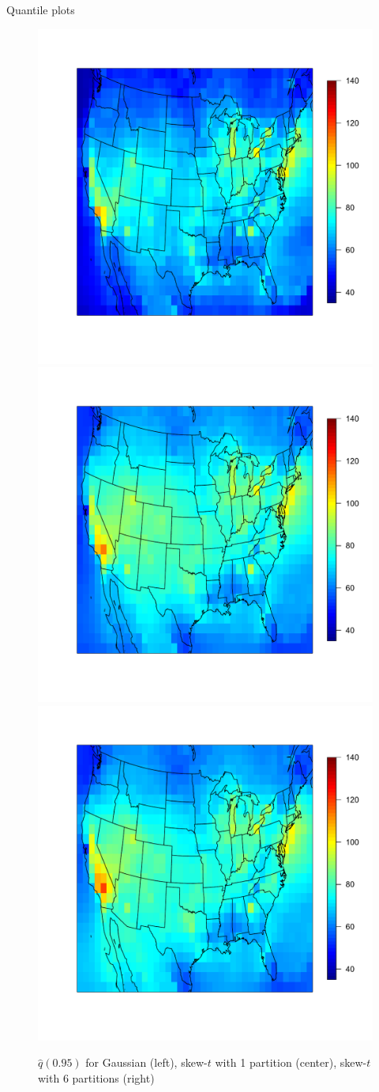 \documentclass{beamer}
\begin{document}
\begin{frame}{Quantile plots}
  \centering
  \begin{figure}
    \includegraphics[width=0.33\linewidth, trim=0.2in 0 0.2in 1in]{./plots/pot/ozone-q95-gaus.pdf}
    \includegraphics[width=0.33\linewidth, trim=0.2in 0 0.2in 1in]{./plots/pot/ozone-q95-t1.pdf}
    \includegraphics[width=0.33\linewidth, trim=0.2in 0 0.2in 1in]{./plots/pot/ozone-q95-t6.pdf}
    \caption{$\widehat{q}(0.95)$ for Gaussian (left), skew-$t$ with 1 partition (center), skew-$t$ with 6 partitions (right)}
  \end{figure}
\end{frame}
\end{document}
